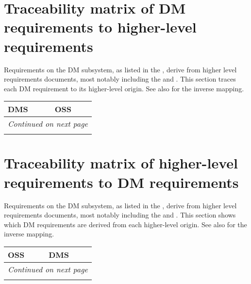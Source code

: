 \newpage
\section{Traceability matrix of DM requirements to higher-level requirements \label{sect:tracefor}}
Requirements on the DM subsystem, as listed in the \DMSR{}, derive from higher level requirements documents, most notably including the \LSR{} and \OSS{}.
This section traces each DM requirement to its higher-level origin.
See also  for the inverse mapping.

\begin{small}
	\begin{longtable}[htb]{|p{}|p{}|} \hline \textbf{DMS} & \textbf{OSS} \\ \hline
\endhead
\hline \multicolumn{2}{r}{\emph{Continued on next page}} \\
\endfoot
\hline\hline
\endlastfoot


\end{longtable}
\end{small}

\newpage
\section{Traceability matrix of higher-level requirements to DM requirements \label{sect:traceback}}
Requirements on the DM subsystem, as listed in the \DMSR{}, derive from higher level requirements documents, most notably including the \LSR{} and \OSS{}.
This section shows which DM requirements are derived from each higher-level origin.
See also  for the inverse mapping.

\begin{small}
	\begin{longtable}[htb]{|p{}|p{}|} \hline \textbf{OSS} & \textbf{DMS} \\ \hline
\endhead
\hline \multicolumn{2}{r}{\emph{Continued on next page}} \\
\endfoot
\hline\hline
\endlastfoot



\end{longtable}
\end{small}
